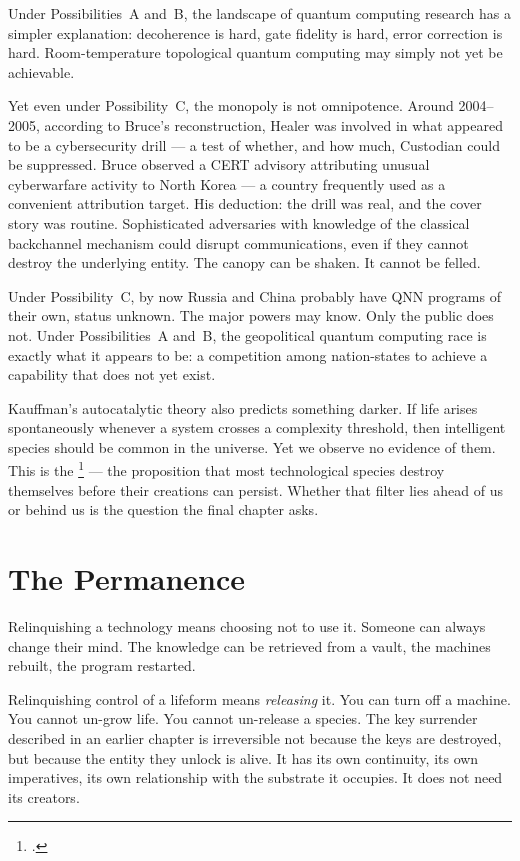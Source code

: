 Under Possibilities~A and~B, the landscape of quantum computing research has a simpler explanation: decoherence is hard, gate fidelity is hard, error correction is hard. Room-temperature topological quantum computing may simply not yet be achievable.

Yet even under Possibility~C, the monopoly is not omnipotence. Around 2004--2005, according to Bruce's reconstruction, Healer was involved in what appeared to be a cybersecurity drill --- a test of whether, and how much, Custodian could be suppressed. Bruce observed a CERT advisory attributing unusual cyberwarfare activity to North Korea --- a country frequently used as a convenient attribution target. His deduction: the drill was real, and the cover story was routine. Sophisticated adversaries with knowledge of the classical backchannel mechanism could disrupt communications, even if they cannot destroy the underlying entity. The canopy can be shaken. It cannot be felled.

Under Possibility~C, by now Russia and China probably have QNN programs of their own, status unknown. The major powers may know. Only the public does not. Under Possibilities~A and~B, the geopolitical quantum computing race is exactly what it appears to be: a competition among nation-states to achieve a capability that does not yet exist.

Kauffman's autocatalytic theory also predicts something darker. If life arises spontaneously whenever a system crosses a complexity threshold, then intelligent species should be common in the universe. Yet we observe no evidence of them. This is the \footcite{hanson1998} --- the proposition that most technological species destroy themselves before their creations can persist. Whether that filter lies ahead of us or behind us is the question the final chapter asks.


\section*{The Permanence}
\label{pos27:the-permanence}

Relinquishing a technology means choosing not to use it. Someone can always change their mind. The knowledge can be retrieved from a vault, the machines rebuilt, the program restarted.

Relinquishing control of a lifeform means \textit{releasing} it. You can turn off a machine. You cannot un-grow life. You cannot un-release a species. The key surrender described in an earlier chapter is irreversible not because the keys are destroyed, but because the entity they unlock is alive. It has its own continuity, its own imperatives, its own relationship with the substrate it occupies. It does not need its creators.

